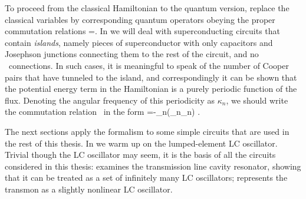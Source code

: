 To proceed from the classical Hamiltonian to the quantum version, replace the classical variables by corresponding quantum operators obeying the proper commutation relations
\be \bigl[\ph_n,q_n\bigr]=\rmi\hbar \label{eq:comm1}.\ee%
%
In  we will deal with superconducting circuits that contain \emph{islands}, \label{sec:specialcomm} namely pieces of superconductor with only capacitors and Josephson junctions connecting them to the rest of the circuit, and no \dc\ connections. In such cases, it is meaningful to speak of the number of Cooper pairs that have tunneled to the island, and correspondingly it can be shown that the potential energy term in the Hamiltonian is a purely periodic function of the flux. Denoting the angular frequency of this periodicity as $\kappa_n$, we should write the commutation relation~ in the form
\be {}=-\hbar\kappa_n\exp(\rmi\kappa_n\ph_n) \label{eq:comm2}.\ee

The next sections apply the formalism to some simple circuits that are used in the rest of this thesis. In  we warm up on the lumped-element LC oscillator. Trivial though the LC oscillator may seem, it is the basis of all the circuits considered in this thesis:  examines the transmission line cavity resonator, showing that it can be treated as a set of infinitely many LC oscillators;  represents the transmon as a slightly nonlinear LC oscillator.

